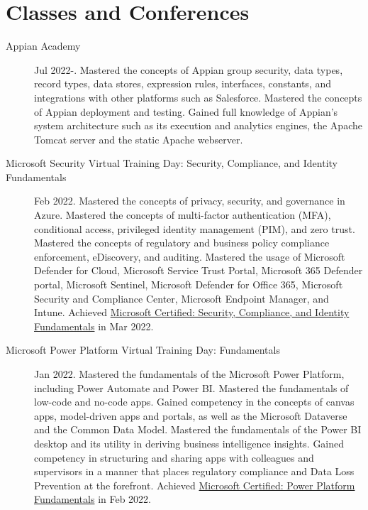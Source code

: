 \documentclass{article}
\begin{document}

\vspace{-1em}
\section*{Classes and Conferences}\vspace{-0.5em}
\begin{description}
  \item [Appian Academy] Jul 2022-. Mastered the concepts of Appian group security, data types, record types, data stores, expression rules, interfaces, constants, and integrations with other platforms such as Salesforce. Mastered the concepts of Appian deployment and testing. Gained full knowledge of Appian's system architecture such as its execution and analytics engines, the Apache Tomcat server and the static Apache webserver.
  \item [Microsoft Security Virtual Training Day: Security, Compliance, and Identity Fundamentals] Feb 2022. Mastered the concepts of privacy, security, and governance in Azure. Mastered the concepts of multi-factor authentication (MFA), conditional access, privileged identity management (PIM), and zero trust. Mastered the concepts of regulatory and business policy compliance enforcement, eDiscovery, and auditing. Mastered the usage of Microsoft Defender for Cloud, Microsoft Service Trust Portal, Microsoft 365 Defender portal, Microsoft Sentinel, Microsoft Defender for Office 365, Microsoft Security and Compliance Center, Microsoft Endpoint Manager, and Intune. Achieved \href{https://www.credly.com/badges/606ab01b-911d-4408-a6a8-303b121d4fc8/public_url}{Microsoft Certified: Security, Compliance, and Identity Fundamentals} in Mar 2022.
  \item [Microsoft Power Platform Virtual Training Day: Fundamentals] Jan 2022. Mastered the fundamentals of the Microsoft Power Platform, including Power Automate and Power BI. Mastered the fundamentals of low-code and no-code apps. Gained competency in the concepts of canvas apps, model-driven apps and portals, as well as the Microsoft Dataverse and the Common Data Model. Mastered the fundamentals of the Power BI desktop and its utility in deriving business intelligence insights. Gained competency in structuring and sharing apps with colleagues and supervisors in a manner that places regulatory compliance and Data Loss Prevention at the forefront. Achieved \href{https://www.credly.com/badges/eeabb8f3-4c51-431e-9174-1528f4ecd6d3/public_url}{Microsoft Certified: Power Platform Fundamentals} in Feb 2022.

\end{description}
\end{document}
